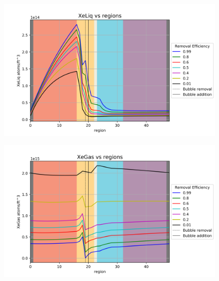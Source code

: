 \begin{figure}[p] 
\centering
\begin{minipage}{.5\textwidth}
  \centering
  \includegraphics[width=1.0\linewidth]{images/EffXeLiq.png}
  \label{fig:EffXeLiq}
\end{minipage}%
\begin{minipage}{.5\textwidth}
  \centering
  \includegraphics[width=1.0\linewidth]{images/EffXeGas.png}
  \label{fig:EffXeGas}
\end{minipage}
\end{figure}

\FloatBarrier
\newpage
\FloatBarrier


